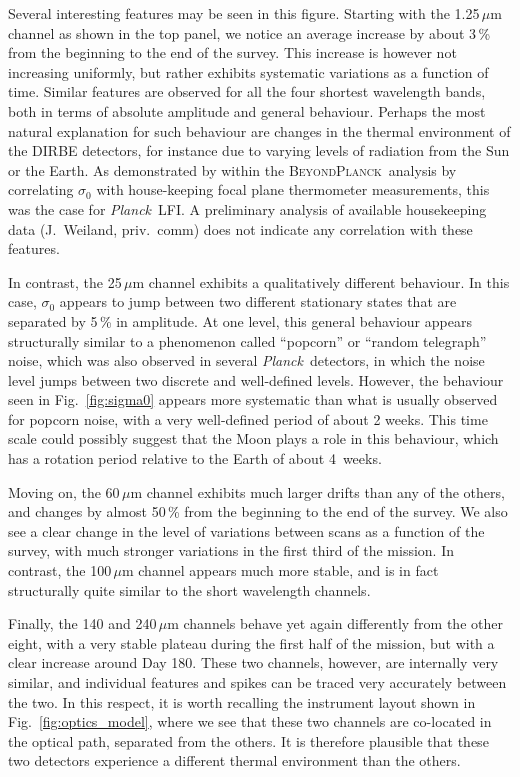 \documentclass{aa}
\def\Planck{\textit{Planck}}
\newcommand{\BP}{\textsc{BeyondPlanck}}
\begin{document}
Several interesting features may be seen in this figure. Starting with
the 1.25$\,\mu$m channel as shown in the top panel, we notice an
average increase by about 3\,\% from the beginning to the end of the
survey. This increase is however not increasing uniformly, but rather
exhibits systematic variations as a function of time. Similar features
are observed for all the four shortest wavelength bands, both in terms
of absolute amplitude and general behaviour. Perhaps the most natural
explanation for such behaviour are changes in the thermal environment
of the DIRBE detectors, for instance due to varying levels of
radiation from the Sun or the Earth. As demonstrated by \citet{bp06}
within the \BP\ analysis by correlating $\sigma_0$ with house-keeping
focal plane thermometer measurements, this was the case for
\Planck\ LFI. 
{A preliminary analysis of available housekeeping data (J.~Weiland, priv.~comm) does not
indicate any correlation with these features.}


       
In contrast, the 25$\,\mu$m channel exhibits a qualitatively different
behaviour. In this case, $\sigma_0$ appears to jump between two
different stationary states that are separated by 5\,\% in
amplitude. At one level, this general behaviour appears structurally
similar to a phenomenon called ``popcorn'' or ``random telegraph''
noise, which was also observed in several \Planck\ detectors, in which
the noise level jumps between two discrete and well-defined
levels. However, the behaviour seen in Fig.~\ref{fig:sigma0} appears
more systematic than what is usually observed for popcorn noise, with
a very well-defined period of about 2 weeks. This time scale could
possibly suggest that the Moon plays a role in this behaviour, which
has a rotation period relative to the Earth of about 4~weeks.

Moving on, the 60$\,\mu$m channel exhibits much larger drifts than any
of the others, and changes by almost 50\,\% from the beginning to the
end of the survey. We also see a clear change in the level of
variations between scans as a function of the survey, with much
stronger variations in the first third of the mission. In contrast,
the 100\,$\mu$m channel appears much more stable, and is in fact
structurally quite similar to the short wavelength channels.

Finally, the 140 and 240$\,\mu$m channels behave yet again differently
from the other eight, with a very stable plateau during the first half
of the mission, but with a clear increase around Day 180. These two
channels, however, are internally very similar, and individual
features and spikes can be traced very accurately between the two. In
this respect, it is worth recalling the instrument layout shown in
Fig.~\ref{fig:optics_model}, where we see that these two channels are
co-located in the optical path, separated from the others. It is
therefore plausible that these two detectors experience a different
thermal environment than the others.
\end{document}
